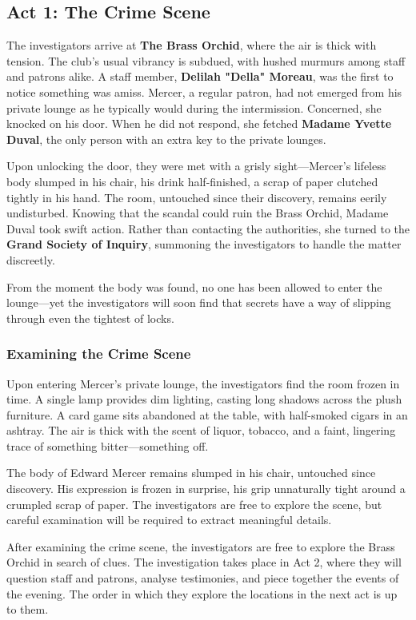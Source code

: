 \subsection{Act 1: The Crime Scene}


The investigators arrive at \textbf{The Brass Orchid}, where the air is thick with tension. The club’s usual vibrancy is subdued, with hushed murmurs among staff and patrons alike. A staff member, \textbf{Delilah "Della" Moreau}, was the first to notice something was amiss. Mercer, a regular patron, had not emerged from his private lounge as he typically would during the intermission. Concerned, she knocked on his door. When he did not respond, she fetched \textbf{Madame Yvette Duval}, the only person with an extra key to the private lounges. 

Upon unlocking the door, they were met with a grisly sight—Mercer’s lifeless body slumped in his chair, his drink half-finished, a scrap of paper clutched tightly in his hand. The room, untouched since their discovery, remains eerily undisturbed. Knowing that the scandal could ruin the Brass Orchid, Madame Duval took swift action. Rather than contacting the authorities, she turned to the \textbf{Grand Society of Inquiry}, summoning the investigators to handle the matter discreetly.

From the moment the body was found, no one has been allowed to enter the lounge—yet the investigators will soon find that secrets have a way of slipping through even the tightest of locks.


\subsubsection{Examining the Crime Scene}

Upon entering Mercer's private lounge, the investigators find the room frozen in time. A single lamp provides dim lighting, casting long shadows across the plush furniture. A card game sits abandoned at the table, with half-smoked cigars in an ashtray. The air is thick with the scent of liquor, tobacco, and a faint, lingering trace of something bitter—something off.

The body of Edward Mercer remains slumped in his chair, untouched since discovery. His expression is frozen in surprise, his grip unnaturally tight around a crumpled scrap of paper. The investigators are free to explore the scene, but careful examination will be required to extract meaningful details.

After examining the crime scene, the investigators are free to explore the Brass Orchid in search of clues. The investigation takes place in Act 2, where they will question staff and patrons, analyse testimonies, and piece together the events of the evening. The order in which they explore the locations in the next act is up to them.

